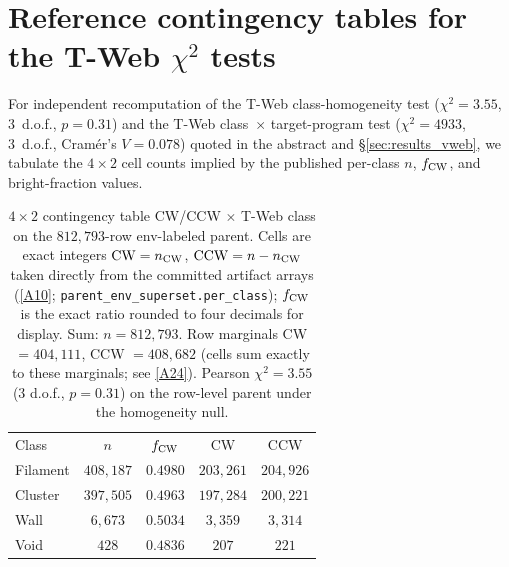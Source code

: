 \documentclass[aps,prd,twocolumn,superscriptaddress,showpacs,preprintnumbers,nofootinbib,longbibliography,floatfix]{revtex4-2}
\newcommand{\repoBase}{https://github.com/Hubify-Projects/bigbounce/blob/main}
\begin{document}
\section{Reference contingency tables for the T-Web $\chi^2$ tests}\label{app:contingency}

For independent recomputation of the T-Web class-homogeneity test
($\chi^2 = 3.55$, 3~d.o.f., $p = 0.31$) and the T-Web class~$\times$
target-program test ($\chi^2 = 4933$, 3~d.o.f., Cram\'er's $V = 0.078$)
quoted in the abstract and \S\ref{sec:results_vweb}, we tabulate
the $4{\times}2$ cell counts implied by the published per-class $n$,
$f_{\rm CW}$, and bright-fraction values.

\begin{table}[!htbp]
\caption{$4{\times}2$ contingency table CW/CCW $\times$ T-Web class on
the $812{,}793$-row env-labeled parent. Cells are exact integers
$\mathrm{CW} = n_{\rm CW}$, $\mathrm{CCW} = n - n_{\rm CW}$ taken
directly from the committed artifact arrays
(\href{\repoBase/pipelines/p5\_desi\_chirality/outputs/17\_v0151\_closure\_recomputes.json}{[A10]};
\texttt{parent\_env\_superset.per\_class}); $f_{\rm CW}$ is the
exact ratio rounded to four decimals for display. Sum: $n = 812{,}793$.
Row marginals CW $= 404{,}111$, CCW $= 408{,}682$ (cells sum exactly to
these marginals; see
\href{\repoBase/pipelines/p5\_desi\_chirality/outputs/31\_ext5\_appendixB\_tables.json}{[A24]}).
Pearson $\chi^2 = 3.55$ ($3$ d.o.f., $p = 0.31$) on the row-level
parent under the homogeneity null.\label{tab:contingency_classCWCCW}}
\begin{ruledtabular}
\begin{tabular}{lcccc}
Class & $n$ & $f_{\rm CW}$ & CW & CCW \\
\colrule
Filament & $408{,}187$ & $0.4980$ & $203{,}261$ & $204{,}926$ \\
Cluster  & $397{,}505$ & $0.4963$ & $197{,}284$ & $200{,}221$ \\
Wall     & $6{,}673$   & $0.5034$ & $3{,}359$   & $3{,}314$   \\
Void     & $428$       & $0.4836$ & $207$       & $221$       \\
\end{tabular}
\end{ruledtabular}
\end{table}
\end{document}
